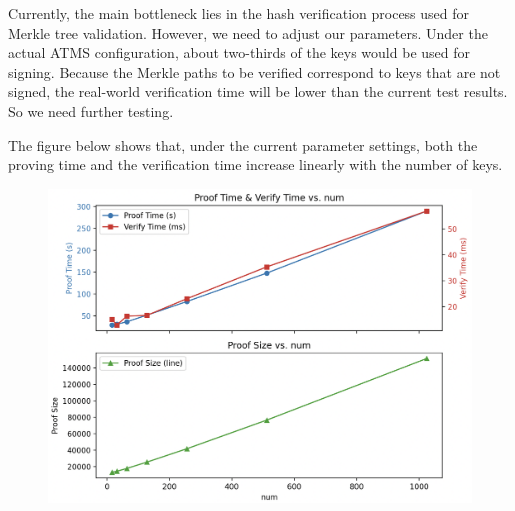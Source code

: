 \documentclass{article}
\begin{document}
Currently, the main bottleneck lies in the hash verification process used for Merkle tree validation. However, we need to adjust our parameters. Under the actual ATMS configuration, about two-thirds of the keys would be used for signing. Because the Merkle paths to be verified correspond to keys that are not signed, the real-world verification time will be lower than the current test results. So we need further testing.

\newpage

The figure below shows that, under the current parameter settings, both the proving time and the verification time increase linearly with the number of keys.
\begin{figure}[htbp]
    \centering
    \includegraphics[width=1\linewidth]{test2.png}
    \label{fig:enter-label}
\end{figure}
\end{document}
